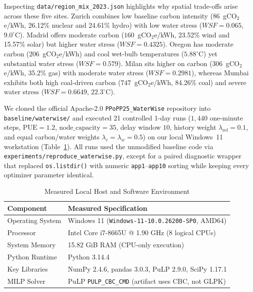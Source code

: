 \documentclass[conference]{IEEEtran}
\begin{document}
Inspecting \texttt{data/region\_mix\_2023.json} highlights why spatial trade-offs arise across these five sites. Zurich combines low baseline carbon intensity ($86$~gCO$_2$e/kWh, 26.12\% nuclear and 24.61\% hydro) with low water stress ($WSF = 0.065$, $9.0^\circ$C). Madrid offers moderate carbon ($160$~gCO$_2$e/kWh, 23.52\% wind and 15.57\% solar) but higher water stress ($WSF = 0.4325$). Oregon has moderate carbon ($206$~gCO$_2$e/kWh) and cool wet-bulb temperatures ($5.88^\circ$C) yet substantial water stress ($WSF = 0.579$). Milan sits higher on carbon ($306$~gCO$_2$e/kWh, 35.2\% gas) with moderate water stress ($WSF = 0.2981$), whereas Mumbai exhibits both high coal-driven carbon ($747$~gCO$_2$e/kWh, 84.26\% coal) and severe water stress ($WSF = 0.6649$, $22.3^\circ$C).

We cloned the official Apache-2.0 \texttt{PPoPP25\_WaterWise} repository into \texttt{baseline/waterwise/} and executed 21 controlled 1-day runs ($1,440$ one-minute steps, $\mathrm{PUE}=1.2$, $\mathrm{node\_capacity}=35$, delay window $10$, history weight $\lambda_{\mathrm{ref}}=0.1$, and equal carbon/water weights $\lambda_c=\lambda_w=0.5$) on our local Windows~11 workstation (Table~\ref{tab:host_env}). All runs used the unmodified baseline code via \texttt{experiments/reproduce\_waterwise.py}, except for a paired diagnostic wrapper that replaced \texttt{os.listdir()} with numeric \texttt{app1}--\texttt{app10} sorting while keeping every optimizer parameter identical.

\begin{table}[!t]
\caption{Measured Local Host and Software Environment}
\label{tab:host_env}
\centering
\scriptsize
\renewcommand{\arraystretch}{1.15}
\begin{tabular}{@{}ll@{}}
\toprule
\textbf{Component} & \textbf{Measured Specification} \\
\midrule
Operating System & Windows 11 (\texttt{Windows-11-10.0.26200-SP0}, AMD64) \\
Processor & Intel Core i7-8665U @ 1.90 GHz (8 logical CPUs) \\
System Memory & 15.82 GiB RAM (CPU-only execution) \\
Python Runtime & Python 3.14.4 \\
Key Libraries & NumPy 2.4.6, pandas 3.0.3, PuLP 2.9.0, SciPy 1.17.1 \\
MILP Solver & PuLP \texttt{PULP\_CBC\_CMD} (artifact uses CBC, not GLPK) \\
\bottomrule
\end{tabular}
\end{table}
\end{document}
